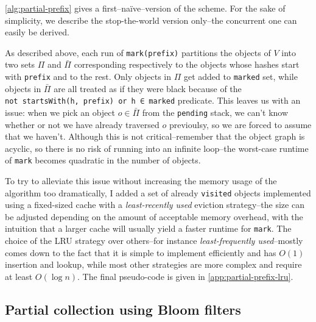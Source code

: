 \cref{alg:partial-prefix} gives a first--naïve--version of the scheme. For the sake of simplicity, we describe the stop-the-world version only--the concurrent one can easily be derived.

\vspace{-.8em}

\vspace{-.8em}

As described above, each run of \texttt{mark(prefix)} partitions the objects of \(V\) into two sets \(\Pi\) and \(\bar{\Pi}\) corresponding respectively to the objects whose hashes start with \texttt{prefix} and to the rest. Only objects in \(\Pi\) get added to \texttt{marked} set, while objects in \(\bar{\Pi}\) are all treated as if they were black because of the \texttt{not\ startsWith(h,\ prefix)\ or\ h\ ∈\ marked} predicate. This leaves us with an issue: when we pick an object \(o \in \bar{\Pi}\) from the \texttt{pending} stack, we can't know whether or not we have already traversed \(o\) previoulsy, so we are forced to assume that we haven't. Although this is not critical--remember that the object graph is acyclic, so there is no risk of running into an infinite loop--the worst-case runtime of \texttt{mark} becomes quadratic in the number of objects.

To try to alleviate this issue without increasing the memory usage of the algorithm too dramatically, I added a set of already \texttt{visited} objects implemented using a fixed-sized cache with a \emph{least-recently used} eviction strategy--the size can be adjusted depending on the amount of acceptable memory overhead, with the intuition that a larger cache will usually yield a faster runtime for \texttt{mark}. The choice of the LRU strategy over others--for instance \emph{least-frequently used}--mostly comes down to the fact that it is simple to implement efficiently and has \(O(1)\) insertion and lookup, while most other strategies are more complex and require at least \(O(\log{n})\). The final pseudo-code is given in \cref{app:partial-prefix-lru}.


\subsection{Partial collection using Bloom filters}

